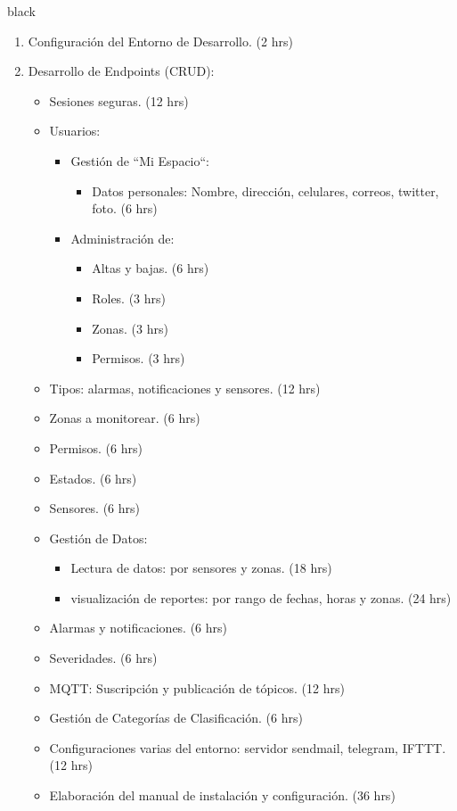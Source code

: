 \documentclass[11pt]{charter}
\begin{document}
\begin{consigna}{black}
\begin{enumerate}
\begin{enumerate}
		\item Configuración del Entorno de Desarrollo. (2 hrs)
		\item Desarrollo de Endpoints (CRUD):
		\begin{itemize}
			\item Sesiones seguras. (12 hrs)
			\item Usuarios:
			\begin{itemize}
				\item Gestión de ``Mi Espacio``:
				\begin{itemize}
					\item Datos personales: Nombre, dirección, celulares, correos, twitter, foto. (6 hrs)
				\end{itemize}
				\item Administración de:
				\begin{itemize}
					\item Altas y bajas. (6 hrs) 
					\item Roles. (3 hrs)
					\item Zonas. (3 hrs)
					\item Permisos. (3 hrs)
				\end{itemize}
			\end{itemize}
			\item Tipos: alarmas, notificaciones y sensores. (12 hrs) 
			\item Zonas a monitorear. (6 hrs) 
			\item Permisos. (6 hrs) 
			\item Estados. (6 hrs) 
			\item Sensores. (6 hrs) 
			\item Gestión de Datos:
			\begin{itemize}
				\item Lectura de datos: por sensores y zonas. (18 hrs) 
				\item visualización de reportes: por rango de fechas, horas y zonas. (24 hrs) 
			\end{itemize}
			\item Alarmas y notificaciones. (6 hrs) 
			\item Severidades. (6 hrs) 
			\item MQTT: Suscripción y publicación de tópicos. (12 hrs) 
			\item Gestión de Categorías de Clasificación. (6 hrs) 
			\item Configuraciones varias del entorno: servidor sendmail, telegram, IFTTT. (12 hrs) 
			\item Elaboración del manual de instalación y configuración. (36 hrs)  

\end{itemize}
\end{enumerate}
\end{enumerate}
\end{consigna}
\end{document}
